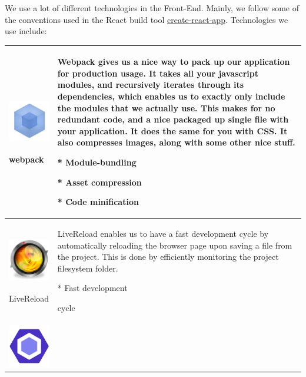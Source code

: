 We use a lot of different technologies in the Front-End. Mainly, we
follow some of the conventions used in the React build tool
\href{https://github.com/facebook/create-react-app/}{{create-react-app}}.
Technologies we use include:

\begin{longtable}[]{@{}ll@{}}
\toprule
\begin{minipage}[b]{0.47\columnwidth}\raggedright
\includegraphics[width=0.77633in,height=0.77633in]{media/image22.png}

webpack\strut
\end{minipage} & \begin{minipage}[b]{0.47\columnwidth}\raggedright
Webpack gives us a nice way to pack up our application for production
usage. It takes all your javascript modules, and recursively iterates
through its dependencies, which enables us to exactly only include the
modules that we actually use. This makes for no redundant code, and a
nice packaged up single file with your application. It does the same for
you with CSS. It also compresses images, along with some other nice
stuff.

* Module-bundling

* Asset compression

* Code minification\strut
\end{minipage}\tabularnewline
\midrule
\endhead
\begin{minipage}[t]{0.47\columnwidth}\raggedright
\includegraphics[width=0.77633in,height=0.77633in]{media/image39.png}

LiveReload\strut
\end{minipage} & \begin{minipage}[t]{0.47\columnwidth}\raggedright
LiveReload enables us to have a fast development cycle by automatically
reloading the browser page upon saving a file from the project. This is
done by efficiently monitoring the project filesystem folder.

* Fast development

cycle\strut
\end{minipage}\tabularnewline
\begin{minipage}[t]{0.47\columnwidth}\raggedright
\includegraphics[width=0.74114in,height=0.74114in]{media/image32.png}


\end{minipage}
\end{longtable}
